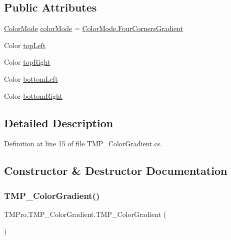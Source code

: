 \subsection*{Public Attributes}
\begin{DoxyCompactItemize}
\item 
\mbox{\hyperlink{namespace_t_m_pro_ad6c4f3ea250d747999f28f1f7678c4b3}{Color\+Mode}} \mbox{\hyperlink{class_t_m_pro_1_1_t_m_p___color_gradient_ae4b077f3e706fd554da95fe79eeb7a33}{color\+Mode}} = \mbox{\hyperlink{namespace_t_m_pro_ad6c4f3ea250d747999f28f1f7678c4b3a67770dd4dc1eec40719e9e72336f234a}{Color\+Mode.\+Four\+Corners\+Gradient}}
\item 
Color \mbox{\hyperlink{class_t_m_pro_1_1_t_m_p___color_gradient_add761a25f601b2bc256bbfd5508273e6}{top\+Left}}
\item 
Color \mbox{\hyperlink{class_t_m_pro_1_1_t_m_p___color_gradient_a1d43c017959ce5b0fb38a2db7b4ed8a7}{top\+Right}}
\item 
Color \mbox{\hyperlink{class_t_m_pro_1_1_t_m_p___color_gradient_a62988544237aa04d417b3d84c87370b2}{bottom\+Left}}
\item 
Color \mbox{\hyperlink{class_t_m_pro_1_1_t_m_p___color_gradient_ae3cdb55acae4d10fa309586b7af75d26}{bottom\+Right}}
\end{DoxyCompactItemize}


\subsection{Detailed Description}


Definition at line 15 of file T\+M\+P\+\_\+\+Color\+Gradient.\+cs.



\subsection{Constructor \& Destructor Documentation}
\mbox{\label{class_t_m_pro_1_1_t_m_p___color_gradient_ade6a10f2d14048890c9e4d93c8f33012}} 
\subsubsection{\texorpdfstring{TMP\_ColorGradient()}{TMP\_ColorGradient()}\hspace{0.1cm}{\footnotesize\ttfamily [1/3]}}
{\footnotesize\ttfamily T\+M\+Pro.\+T\+M\+P\+\_\+\+Color\+Gradient.\+T\+M\+P\+\_\+\+Color\+Gradient (\begin{DoxyParamCaption}{ }\end{DoxyParamCaption})}




